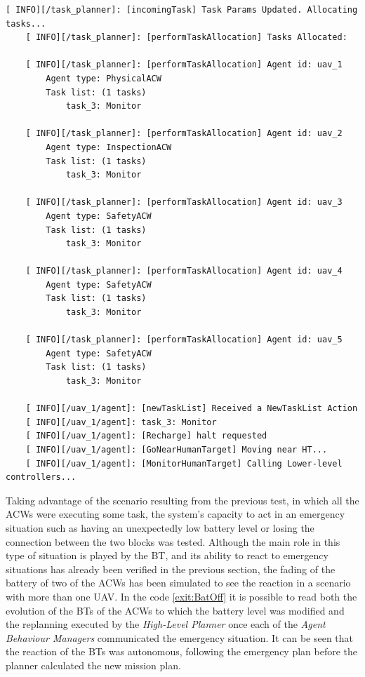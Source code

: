 \begin{lstlisting}[caption={Feedback messages printed after changing the parameters of a task}, breaklines=true, label=exit:paramChange]
    [ INFO][/task_planner]: [incomingTask] Task Params Updated. Allocating tasks...
    [ INFO][/task_planner]: [performTaskAllocation] Tasks Allocated:
    
    [ INFO][/task_planner]: [performTaskAllocation] Agent id: uav_1
        Agent type: PhysicalACW
        Task list: (1 tasks)
            task_3: Monitor
    
    [ INFO][/task_planner]: [performTaskAllocation] Agent id: uav_2
        Agent type: InspectionACW
        Task list: (1 tasks)
            task_3: Monitor
    
    [ INFO][/task_planner]: [performTaskAllocation] Agent id: uav_3
        Agent type: SafetyACW
        Task list: (1 tasks)
            task_3: Monitor
    
    [ INFO][/task_planner]: [performTaskAllocation] Agent id: uav_4
        Agent type: SafetyACW
        Task list: (1 tasks)
            task_3: Monitor
    
    [ INFO][/task_planner]: [performTaskAllocation] Agent id: uav_5
        Agent type: SafetyACW
        Task list: (1 tasks)
            task_3: Monitor
    
    [ INFO][/uav_1/agent]: [newTaskList] Received a NewTaskList Action
    [ INFO][/uav_1/agent]: task_3: Monitor
    [ INFO][/uav_1/agent]: [Recharge] halt requested
    [ INFO][/uav_1/agent]: [GoNearHumanTarget] Moving near HT...
    [ INFO][/uav_1/agent]: [MonitorHumanTarget] Calling Lower-level controllers...
\end{lstlisting}

Taking advantage of the scenario resulting from the previous test, in which all the \glspl{ACW} were executing some task, the system's capacity to act in an emergency situation such as having an unexpectedly low battery level or losing the connection between the two blocks was tested. Although the main role in this type of situation is played by the \gls{BT}, and its ability to react to emergency situations has already been verified in the previous section, the fading of the battery of two of the \glspl{ACW} has been simulated to see the reaction in a scenario with more than one \gls{UAV}. In the code \ref{exit:BatOff} it is possible to read both the evolution of the \glspl{BT} of the \glspl{ACW} to which the battery level was modified and the replanning executed by the \emph{High-Level Planner} once each of the \emph{Agent Behaviour Managers} communicated the emergency situation. It can be seen that the reaction of the \glspl{BT} was autonomous, following the emergency plan before the planner calculated the new mission plan.

